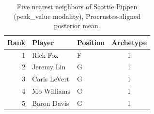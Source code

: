 \begin{table}[htbp]
  \centering\small
  \begin{tabular}{rllc}
    \toprule
    Rank & Player & Position & Archetype \\
    \midrule
    1 & Rick Fox & F & 1 \\
    2 & Jeremy Lin & G & 1 \\
    3 & Caris LeVert & G & 1 \\
    4 & Mo Williams & G & 1 \\
    5 & Baron Davis & G & 1 \\
    \bottomrule
  \end{tabular}
  \caption{Five nearest neighbors of Scottie Pippen (peak_value modality), Procrustes-aligned posterior mean.}
  \label{tab:Scottie_Pippen_neighbors_peak_value}
\end{table}

